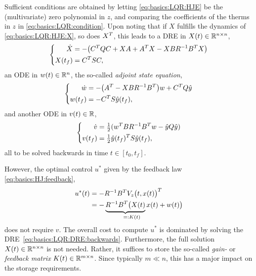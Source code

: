 Sufficient conditions are obtained by letting \eqref{eq:basics:LQR:HJE} be the (multivariate) zero polynomial in $z$,
and comparing the coefficients of the therms in $z$ in \eqref{eq:basics:LQR:condition}.
Upon noting that if $X$ fulfills the dynamics of \eqref{eq:basics:LQR:HJE:X}, so does $X^T$,
this leads to a \ac{DRE} in $X(t)\in\mathbb{R}^{n\times n}$,
\begin{equation}
\label{eq:basics:LQR:DRE:backwards}
\left\{
\begin{aligned}
  \dot X &= -\big( C^T Q C + X A + A^T X - X B R^{-1} B^T X \big) \\
  X(t_f) &= C^T S C
  ,
\end{aligned}
\right.
\end{equation}
an \ac{ODE} in $w(t)\in\mathbb{R}^n$,
the so-called \emph{adjoint state equation},
\begin{equation}
\left\{
\begin{aligned}
  \dot w &= - \big( A^T - X B R^{-1} B^T \big) w + C^T Q \hat y \\
  w(t_f) &= - C^T S \hat y(t_f)
  ,
\end{aligned}
\right.
\end{equation}
and another \ac{ODE} in $v(t)\in\mathbb{R}$,
\begin{equation}
\left\{
\begin{aligned}
  \dot v &= \tfrac{1}{2} ( w^T B R^{-1} B^T w - \hat y Q \hat y) \\
  v(t_f) &= \tfrac{1}{2} \hat y(t_f)^T S \hat y(t_f)
  ,
\end{aligned}
\right.
\end{equation}
all to be solved backwards in time $t \in [t_0,t_f]$.

However, the optimal control $u^*$ given by the feedback law \eqref{eq:basics:HJ:feedback},
\begin{equation}
\label{eq:basics:LQR:u*}
\begin{aligned}
  u^*(t)
  &= - R^{-1} B^\T V_z\big(t, x(t)\big)^\T \\
  &= - \underbrace{
    R^{-1} B^\T \big( X(t)
  }_{=\mathrlap{:K(t)}}
  x(t) + w(t) \big)
\end{aligned}
\end{equation}
does not require $v$.
The overall cost to compute $u^*$ is dominated by solving the \ac{DRE}~\eqref{eq:basics:LQR:DRE:backwards}.
Furthermore, the full solution $X(t)\in\mathbb{R}^{n\times n}$ is not needed.
Rather, it suffices to store the so-called \emph{gain-} or \emph{feedback matrix} $K(t) \in\mathbb{R}^{m\times n}$.
Since typically $m \ll n$, this has a major impact on the storage requirements.

